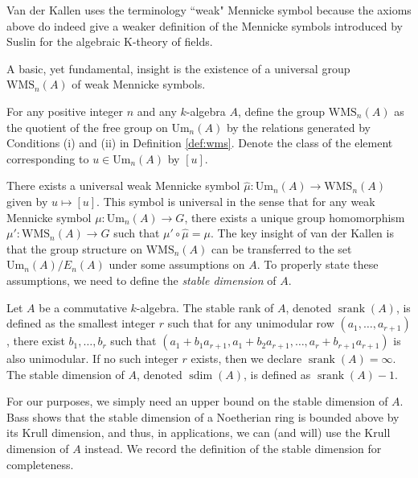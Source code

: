 \begin{remark}
    Van der Kallen uses the terminology ``weak" Mennicke symbol because the axioms above do indeed give a weaker definition of the Mennicke symbols introduced by Suslin \cite{suslin2006mennicke} for the algebraic K-theory of fields.
\end{remark}

A basic, yet fundamental, insight is the existence of a universal group $\mathrm{WMS}_n(A)$ of weak Mennicke symbols.

\begin{definition}
    For any positive integer $n$ and any $k$-algebra $A$, define the group $\mathrm{WMS}_n(A)$ as the quotient of the free group on $\mathrm{Um}_n(A)$ by the relations generated by Conditions (i) and (ii) in Definition \ref{def:wms}. Denote the class of the element corresponding to $u\in \mathrm{Um}_n(A)$ by $[u]$.
\end{definition}

There exists a universal weak Mennicke symbol $\hat{\mu}: \mathrm{Um}_n(A) \to \mathrm{WMS}_n(A)$ given by $u \mapsto [u]$. This symbol is universal in the sense that for any weak Mennicke symbol $\mu: \mathrm{Um}_n(A) \to G$, there exists a unique group homomorphism $\mu': \mathrm{WMS}_n(A) \to G$ such that $\mu' \circ \hat{\mu} = \mu$. The key insight of van der Kallen is that the group structure on $\mathrm{WMS}_n(A)$ can be transferred to the set $\mathrm{Um}_n(A)/E_n(A)$ under some assumptions on $A$. To properly state these assumptions, we need to define the \textit{stable dimension} of $A$.

\begin{definition}
    Let $A$ be a commutative $k$-algebra. The stable rank of $A$, denoted $\operatorname{srank}(A)$, is defined as the smallest integer $r$ such that for any unimodular row $(a_1,\ldots,a_{r+1})$, there exist $b_1,\ldots,b_r$ such that $(a_1 + b_1a_{r+1}, a_1 + b_2a_{r+1},\ldots, a_{r}+b_{r+1}a_{r+1})$ is also unimodular. If no such integer $r$ exists, then we declare $\operatorname{srank}(A) = \infty$. The stable dimension of $A$, denoted $\operatorname{sdim}(A)$, is defined as $\operatorname{srank}(A) - 1$. 
\end{definition}

\begin{remark}
    For our purposes, we simply need an upper bound on the stable dimension of $A$. Bass \cite[Theorem 1]{bass} shows that the stable dimension of a Noetherian ring is bounded above by its Krull dimension, and thus, in applications, we can (and will) use the Krull dimension of $A$ instead. We record the definition of the stable dimension for completeness.
\end{remark}

